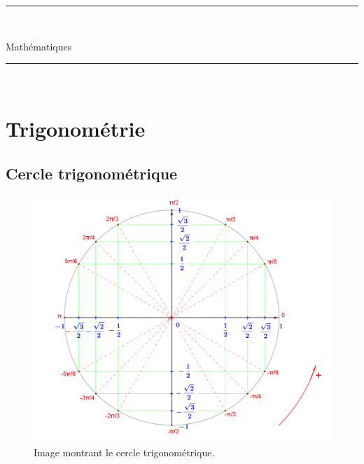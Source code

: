 \documentclass[12pt,a4paper,openany]{book}
\title{}
\author{Serrurot Gabin\\
BTS SNIR}
\date{\today}
\begin{document}
\sloppy

\begin{minipage}{0.9\linewidth}
\rule{\linewidth}{0.5mm}\\[0.2cm]
\huge\bfseries
\begin{center}
Mathématiques
\end{center}
\rule{\linewidth}{0.5mm}\\[0.2cm]
\maketitle
\end{minipage}

\newpage

\tableofcontents

\newpage

\chapter{Trigonométrie}

\section{Cercle trigonométrique}

\begin{figure}[!h]
\begin{center}
\includegraphics[scale=0.5]{Images/cercleTrigonometrique.png} 
\caption{Image montrant le cercle trigonométrique.}
\label{cercleTrigo}
\end{center}
\end{figure}
\end{document}
